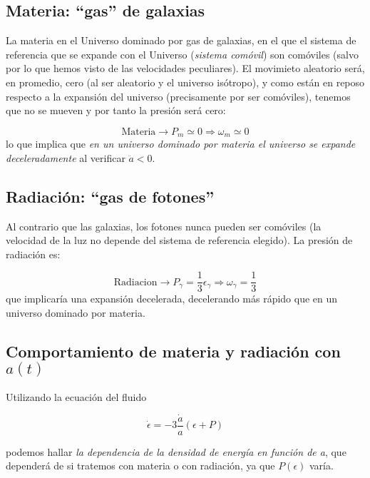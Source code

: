 \subsection{Materia: ``gas'' de galaxias}

La materia en el Universo dominado por gas de galaxias, en el que el sistema de referencia que se expande con el Universo (\textit{sistema comóvil}) son comóviles (salvo por lo que hemos visto de las velocidades peculiares). El movimieto aleatorio será, en promedio, cero (al ser aleatorio y el universo isótropo), y como están en reposo respecto a la expansión del universo (precisamente por ser comóviles), tenemos que no se mueven y por tanto la presión será cero:

\begin{equation}
	\text{Materia} \rightarrow P_m \simeq 0 \Rightarrow \omega_m \simeq 0
\end{equation}
lo que implica que \textit{en un universo dominado por materia el universo se expande deceleradamente} al verificar $\ddot{a}<0$.


\subsection{Radiación: ``gas de fotones''}


Al contrario que las galaxias, los fotones nunca pueden ser comóviles (la velocidad de la luz no depende del sistema de referencia elegido). La presión de radiación es:

\begin{equation}
	\text{Radiacion} \rightarrow P_\gamma = \frac{1}{3} \epsilon_\gamma \Rightarrow \omega_\gamma = \frac{1}{3}
\end{equation}
que implicaría una expansión decelerada, decelerando más rápido que en un universo dominado por materia.

\subsection{Comportamiento de materia y radiación con $a(t)$}

Utilizando la ecuación del fluido

\[ \dot{\epsilon} = -3 \frac{\dot{a}}{a} (\epsilon + P) \]

podemos hallar \textit{la dependencia de la densidad de energía en función de a},  que dependerá de si tratemos con materia o con radiación, ya que $P(\epsilon)$ varía.

